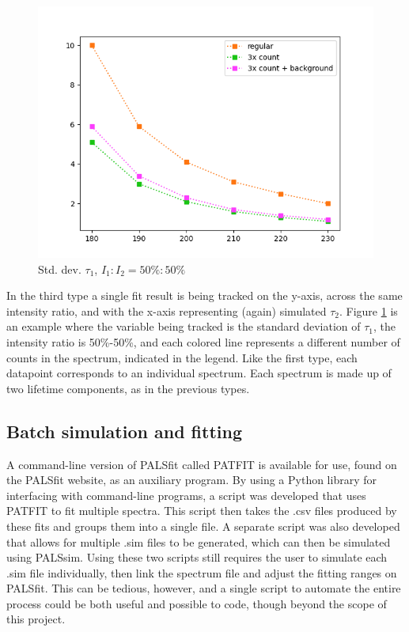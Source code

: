 \begin{figure}[h]
    \centering
    \includegraphics[width=0.6\linewidth]{Batch 5/t1-err 5050.png}
    \caption{Std. dev. $\tau_1$, $I_1:I_2 = 50\%:50\%$}
    \label{fig:type3}
\end{figure}

In the third type a single fit result is being tracked on the y-axis, across the same intensity ratio, and with the x-axis representing (again) simulated $\tau_2$. Figure \ref{fig:type3} is an example where the variable being tracked is the standard deviation of $\tau_1$, the intensity ratio is 50\%-50\%, and each colored line represents a different number of counts in the spectrum, indicated in the legend. Like the first type, each datapoint corresponds to an individual spectrum. Each spectrum is made up of two lifetime components, as in the previous types.



\subsection{Batch simulation and fitting}
A command-line version of PALSfit called PATFIT is available for use, found on the PALSfit website, as an auxiliary program. By using a Python library for interfacing with command-line programs, a script was developed that uses PATFIT to fit multiple spectra. This script then takes the .csv files produced by these fits and groups them into a single file. A separate script was also developed that allows for multiple .sim files to be generated, which can then be simulated using PALSsim.
Using these two scripts still requires the user to simulate each .sim file individually, then link the spectrum file and adjust the fitting ranges on PALSfit. This can be tedious, however, and a single script to automate the entire process could be both useful and possible to code, though beyond the scope of this project.